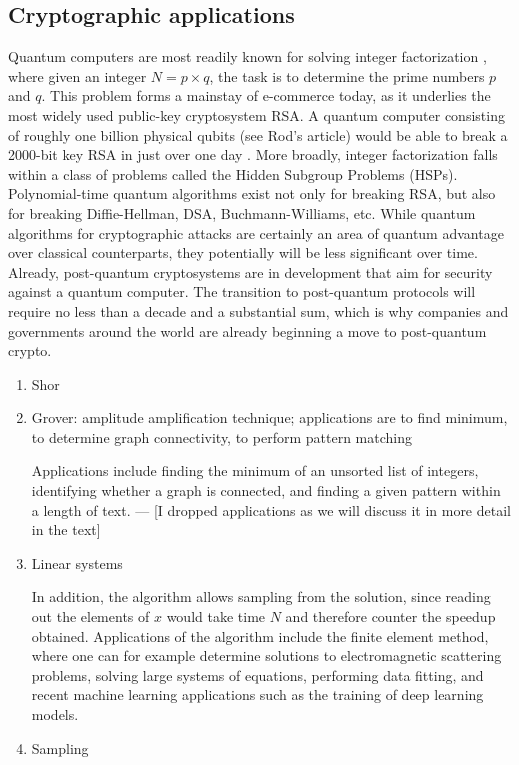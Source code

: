 \documentclass[journal]{IEEEtran}
\begin{document}
\subsection{Cryptographic applications}
Quantum computers are most readily known for solving integer factorization \cite{}, where given an integer $N=p\times q$, the task is to determine the prime numbers $p$ and $q$.  This problem forms a mainstay of e-commerce today, as it underlies the most widely used public-key cryptosystem RSA.  A quantum computer consisting of roughly one billion physical qubits (see Rod's article) would be able to break a 2000-bit key RSA in just over one day \cite{}.  More broadly, integer factorization falls within a class of problems called the Hidden Subgroup Problems (HSPs).  Polynomial-time quantum algorithms exist not only for breaking RSA, but also for breaking Diffie-Hellman, DSA, Buchmann-Williams, etc.
While quantum algorithms for cryptographic attacks are certainly an area of quantum advantage over classical counterparts, they potentially will be less significant over time.  Already, post-quantum cryptosystems are in development that aim for security against a quantum computer.  The transition to post-quantum protocols will require no less than a decade and a substantial sum, which is why companies and governments around the world are already beginning a move to post-quantum crypto.  


\begin{enumerate}
\item    Shor


\item    Grover: amplitude amplification technique; applications are to find minimum, to determine graph connectivity, to perform pattern matching

Applications include finding the minimum of an unsorted list of integers, identifying whether a graph is connected, and finding a given pattern within a length of text. --- [I dropped applications as we will discuss it in more detail in the text]



\item     Linear systems

In addition, the algorithm allows sampling from the solution, since reading out the elements of $x$ would take time $N$ and therefore counter the speedup obtained.
Applications of the algorithm include the finite element method, where one can for example determine solutions to electromagnetic scattering problems, solving large systems of equations, performing data fitting, and recent machine learning applications such as the training of deep learning models.


\item    Sampling
\end{enumerate}
\end{document}
